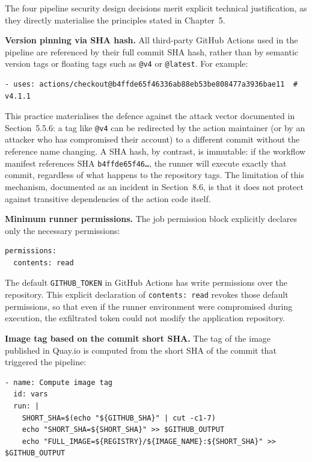 The four pipeline security design decisions merit explicit technical justification, as they directly materialise the principles stated in Chapter~5.

\textbf{Version pinning via SHA hash.} All third-party GitHub Actions used in the pipeline are referenced by their full commit SHA hash, rather than by semantic version tags or floating tags such as \texttt{@v4} or \texttt{@latest}. For example:

\begin{lstlisting}
- uses: actions/checkout@b4ffde65f46336ab88eb53be808477a3936bae11  # v4.1.1
\end{lstlisting}

This practice materialises the defence against the attack vector documented in Section~5.5.6: a tag like \texttt{@v4} can be redirected by the action maintainer (or by an attacker who has compromised their account) to a different commit without the reference name changing. A SHA hash, by contrast, is immutable: if the workflow manifest references SHA \texttt{b4ffde65f46\ldots}, the runner will execute exactly that commit, regardless of what happens to the repository tags. The limitation of this mechanism, documented as an incident in Section~8.6, is that it does not protect against transitive dependencies of the action code itself.

\textbf{Minimum runner permissions.} The job permission block explicitly declares only the necessary permissions:

\begin{lstlisting}
permissions:
  contents: read
\end{lstlisting}

The default \texttt{GITHUB\_TOKEN} in GitHub Actions has write permissions over the repository. This explicit declaration of \texttt{contents: read} revokes those default permissions, so that even if the runner environment were compromised during execution, the exfiltrated token could not modify the application repository.

\textbf{Image tag based on the commit short SHA.} The tag of the image published in Quay.io is computed from the short SHA of the commit that triggered the pipeline:

\begin{lstlisting}
- name: Compute image tag
  id: vars
  run: |
    SHORT_SHA=$(echo "${GITHUB_SHA}" | cut -c1-7)
    echo "SHORT_SHA=${SHORT_SHA}" >> $GITHUB_OUTPUT
    echo "FULL_IMAGE=${REGISTRY}/${IMAGE_NAME}:${SHORT_SHA}" >> $GITHUB_OUTPUT
\end{lstlisting}

